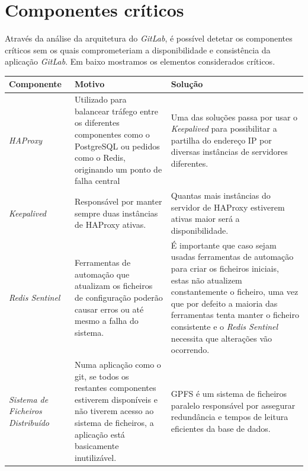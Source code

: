 \documentclass[12pt,a4paper]{article}
\begin{document}
\newpage
\section{Componentes críticos}

Através da análise da arquitetura do \emph{GitLab}, é possível detetar os componentes críticos sem os quais comprometeriam a disponibilidade e consistência da aplicação \emph{GitLab}. Em baixo mostramos os elementos considerados críticos.

\begin{table}[ht]
    \centering
    \begin{adjustbox}{width=1\textwidth}
    \small
    \begin{tabular}{ | p{4cm} | p{7cm} | p{7cm} |}
        \hline
        \textbf{Componente} & \textbf{Motivo} & \textbf{Solução} \\ \hline
        \textit{HAProxy} & Utilizado para balancear tráfego entre os diferentes componentes como o PostgreSQL ou pedidos como o Redis, originando um ponto de falha central & Uma das soluções passa por usar o \textit{Keepalived} para possibilitar a partilha do endereço IP por diversas instâncias de servidores diferentes. \\ \hline
        \textit{Keepalived} &Responsável por manter sempre duas instâncias de HAProxy ativas. & Quantas mais instâncias do servidor de HAProxy estiverem ativas maior será a disponibilidade. \\
        \hline
        \textit{Redis Sentinel} & Ferramentas de automação que atualizam os ficheiros de configuração poderão causar erros ou até mesmo a falha do sistema. & É importante que caso sejam usadas ferramentas de automação para criar os ficheiros iniciais, estas não atualizem constantemente o ficheiro, uma vez que por defeito a maioria das ferramentas tenta manter o ficheiro consistente e o \textit{Redis Sentinel} necessita que alterações vão ocorrendo.  \\
        \hline
        \textit{Sistema de Ficheiros Distribuído} & Numa aplicação como o git, se todos os restantes componentes estiverem disponíveis e não tiverem acesso ao sistema de ficheiros, a aplicação está basicamente inutilizável. & GPFS é um sistema de ficheiros paralelo responsável por assegurar redundância e tempos de leitura eficientes da base de dados.\\
        \hline
    \end{tabular}
    \end{adjustbox}
\end{table} 
\end{document}
